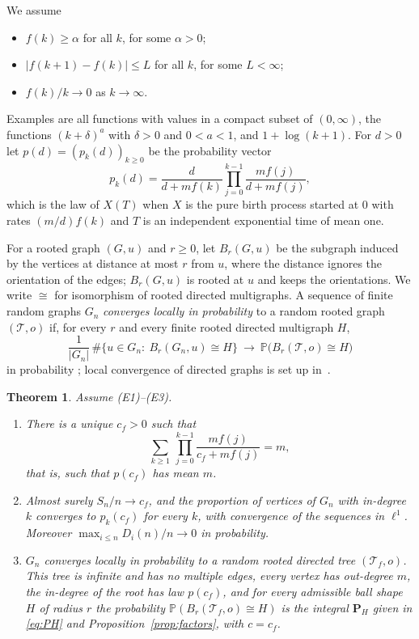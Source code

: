 \documentclass[11pt]{amsart}
\newtheorem{theorem}{Theorem}
\theoremstyle{definition}
\newcommand{\Prob}{\mathbb{P}}
\newcommand{\cT}{\mathcal{T}}
\begin{document}
We assume
\begin{itemize}
\item[\textup{(E1)}] $f(k)\ge\alpha$ for all $k$, for some $\alpha>0$;
\item[\textup{(E2)}] $|f(k+1)-f(k)|\le L$ for all $k$, for some $L<\infty$;
\item[\textup{(E3)}] $f(k)/k\to0$ as $k\to\infty$.
\end{itemize}
Examples are all functions with values in a compact subset of $(0,\infty)$, the functions $(k+\delta)^a$ with
$\delta>0$ and $0<a<1$, and $1+\log(k+1)$. For $d>0$ let $p(d)=(p_k(d))_{k\ge0}$ be the probability vector
\begin{equation}\label{eq:pk}
   p_k(d)=\frac{d}{d+mf(k)}\prod_{j=0}^{k-1}\frac{mf(j)}{d+mf(j)} ,
\end{equation}
which is the law of $X(T)$ when $X$ is the pure birth process started at $0$ with rates $(m/d)f(k)$ and $T$ is
an independent exponential time of mean one.

For a rooted graph $(G,u)$ and $r\ge0$, let $B_r(G,u)$ be the subgraph induced by the vertices at distance at most
$r$ from $u$, where the distance ignores the orientation of the edges; $B_r(G,u)$ is rooted at $u$ and keeps the
orientations. We write $\cong$ for isomorphism of rooted directed multigraphs. A sequence of finite random graphs
$G_n$ \emph{converges locally in probability} to a random rooted graph $(\cT,o)$ if, for every $r$ and every finite
rooted directed multigraph $H$,
\[
    \frac1{|G_n|}\,\#\bigl\{u\in G_n:\ B_r(G_n,u)\cong H\bigr\}\ \longrightarrow\ \Prob\bigl(B_r(\cT,o)\cong H\bigr)
\]
in probability \cite{BS,AS,vdH2}; local convergence of directed graphs is set up in~\cite{GvdHL}.

\begin{theorem}\label{thm:main}
Assume \textup{(E1)--(E3)}.
\begin{enumerate}
\item[\textup{(i)}] There is a unique $c_f>0$ such that
\[
     \sum_{k\ge1}\ \prod_{j=0}^{k-1}\frac{mf(j)}{c_f+mf(j)}=m ,
\]
that is, such that $p(c_f)$ has mean $m$.
\item[\textup{(ii)}] Almost surely $S_n/n\to c_f$, and the proportion of vertices of $G_n$ with in-degree $k$
converges to $p_k(c_f)$ for every $k$, with convergence of the sequences in $\ell^1$. Moreover
$\max_{i\le n}D_i(n)/n\to0$ in probability.
\item[\textup{(iii)}] $G_n$ converges locally in probability to a random rooted directed tree $(\cT_f,o)$. This
tree is infinite and has no multiple edges, every vertex has out-degree $m$, the in-degree of the root has law
$p(c_f)$, and for every admissible ball shape $H$ of radius $r$ the probability $\Prob(B_r(\cT_f,o)\cong H)$ is the
integral $\mathbf P_H$ given in \eqref{eq:PH} and Proposition~\ref{prop:factors}, with $c=c_f$.
\end{enumerate}
\end{theorem}
\end{document}

